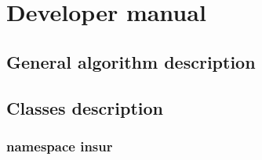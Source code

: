 \documentclass[12pt, a4paper]{article}
\begin{document}
\section{Developer manual}\label{sec:developerManual}

\subsection{General algorithm description}






\subsection{Classes description}

\subsubsection{namespace insur}
\end{document}
